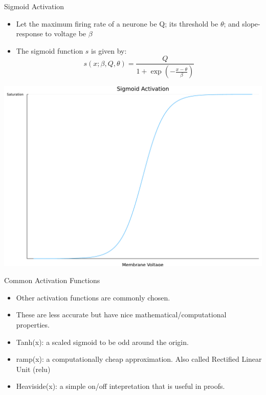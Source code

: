 \documentclass[
  ignorenonframetext,
]{beamer}
\begin{document}
\begin{frame}{Sigmoid Activation}
\protect\hypertarget{sigmoid-activation}{}
\begin{itemize}
\item
  Let the maximum firing rate of a neurone be Q; its threshold be
  \(\theta\); and slope-response to voltage be \(\beta\)
\item
  The sigmoid function \(s\) is given by:
  \[ s(x; \beta, Q, \theta) = \frac{Q}{1 + \exp\left(-\frac{x-\theta}{\beta}\right)}\]
\end{itemize}
\end{frame}

\begin{frame}{}
\protect\hypertarget{section-1}{}
\includegraphics{lecture2_files/figure-beamer/cell-6-output-1.pdf}
\end{frame}

\begin{frame}{Common Activation Functions}
\protect\hypertarget{common-activation-functions}{}
\begin{itemize}
\item
  Other activation functions are commonly chosen.
\item
  These are less accurate but have nice mathematical/computational
  properties.
\item
  Tanh(x): a scaled sigmoid to be odd around the origin.
\item
  ramp(x): a computationally cheap approximation. Also called Rectified
  Linear Unit (relu)
\item
  Heaviside(x): a simple on/off intepretation that is useful in proofs.
\end{itemize}
\end{frame}
\end{document}

